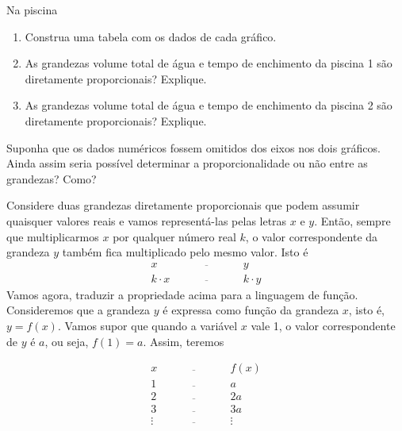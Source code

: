 \begin{task}{Na piscina}
\begin{figure}[H]
\end{figure}

\begin{enumerate}
\item {} 
Construa uma tabela com os dados de cada gráfico.

\item {} 
As grandezas volume total de água e tempo de enchimento da piscina 1 são diretamente proporcionais? Explique.

\item {} 
As grandezas volume total de água e tempo de enchimento da piscina 2 são diretamente proporcionais? Explique.

\end{enumerate}
\end{task}

\begin{reflection}

Suponha que os dados numéricos fossem omitidos dos eixos nos dois gráficos. Ainda assim seria possível determinar a proporcionalidade ou não entre as grandezas? Como?
\end{reflection}


\label{\detokenize{AF107-1::doc}}\label{\detokenize{AF107-1:organizando-as-ideias-funcao-linear}}
Considere duas grandezas diretamente proporcionais que podem assumir quaisquer valores reais e vamos representá-las pelas letras \(x\) e \(y\). Então, sempre que multiplicarmos \(x\) por qualquer número real \(k\), o valor correspondente da grandeza \(y\) também fica multiplicado pelo mesmo valor. Isto é
\[\begin{array}{ccc}
x\quad &\overline{\quad \quad \quad}& \quad y \\
k\cdot x \quad &\overline{\quad \quad \quad}& \quad k\cdot y
  \end{array}\]
Vamos agora, traduzir a propriedade acima para a linguagem de função. Consideremos que a grandeza \(y\) é expressa como função da grandeza \(x\), isto é, \(y=f(x)\). Vamos supor que quando a variável $x$ vale 1, o valor correspondente de $y$ é $a$, ou seja, $f(1)=a$. Assim, teremos

\[\begin{array}{ccc}
x\quad &\overline{\quad \quad \quad}& \quad f(x) \\
1 \quad &\overline{\quad \quad \quad}& \quad a \\
2 \quad &\overline{\quad \quad \quad}& \quad 2a \\
3 \quad &\overline{\quad \quad \quad}& \quad 3a \\
\vdots \quad &\overline{\quad \quad \quad}& \quad \vdots\\
  \end{array}\]

